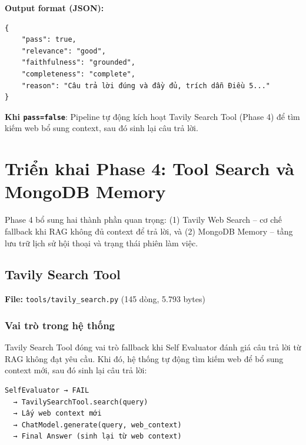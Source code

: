 \documentclass[../DoAn.tex]{subfiles}
\begin{document}
\textbf{Output format (JSON):}
\begin{verbatim}
{
    "pass": true,
    "relevance": "good",
    "faithfulness": "grounded",
    "completeness": "complete",
    "reason": "Câu trả lời đúng và đầy đủ, trích dẫn Điều 5..."
}
\end{verbatim}

\textbf{Khi \texttt{pass=false}}: Pipeline tự động kích hoạt Tavily Search Tool (Phase 4) để tìm kiếm web bổ sung context, sau đó sinh lại câu trả lời.


\section{Triển khai Phase 4: Tool Search và MongoDB Memory}

Phase 4 bổ sung hai thành phần quan trọng: (1) Tavily Web Search -- cơ chế fallback khi RAG không đủ context để trả lời, và (2) MongoDB Memory -- tầng lưu trữ lịch sử hội thoại và trạng thái phiên làm việc.

\subsection{Tavily Search Tool}
\textbf{File:} \texttt{tools/tavily\_search.py} (145 dòng, 5.793 bytes)

\subsubsection{Vai trò trong hệ thống}
Tavily Search Tool đóng vai trò fallback khi Self Evaluator đánh giá câu trả lời từ RAG không đạt yêu cầu. Khi đó, hệ thống tự động tìm kiếm web để bổ sung context mới, sau đó sinh lại câu trả lời:
\begin{verbatim}
SelfEvaluator → FAIL
  → TavilySearchTool.search(query)
  → Lấy web context mới
  → ChatModel.generate(query, web_context)
  → Final Answer (sinh lại từ web context)
\end{verbatim}
\end{document}
